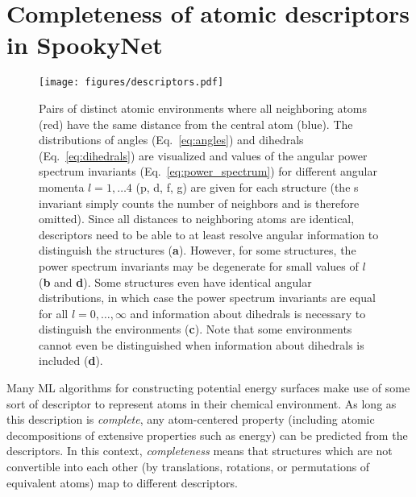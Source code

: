 \documentclass[%
superscriptaddress,
reprint,
nofootinbib,
amsmath,amssymb,amsfonts,
floatfix,
altaffilletter,
showkeys,
]{revtex4-2}
\newcommand{\nn}{SpookyNet}
\begin{document}
\section{Completeness of atomic descriptors in \nn{}}
\label{sec:atomic_descriptors}
\begin{figure*}
	\texttt{[image: figures/descriptors.pdf]}
	\caption{Pairs of distinct atomic environments where all neighboring atoms (red) have the same distance from the central atom (blue). The distributions of angles (Eq.~\ref{eq:angles}) and dihedrals (Eq.~\ref{eq:dihedrals}) are visualized and values of the angular power spectrum invariants (Eq.~\ref{eq:power_spectrum}) for different angular momenta $l=1,\dots4$ (p, d, f, g) are given for each structure (the s invariant simply counts the number of neighbors and is therefore omitted). Since all distances to neighboring atoms are identical, descriptors need to be able to at least resolve angular information to distinguish the structures (\textbf{a}). However, for some structures, the power spectrum invariants may be degenerate for small values of $l$ (\textbf{b} and \textbf{d}). Some structures even have identical angular distributions, in which case the power spectrum invariants are equal for all $l=0,\dots,\infty$ and information about dihedrals is necessary to distinguish the environments (\textbf{c}). Note that some environments cannot even be distinguished when information about dihedrals is included (\textbf{d}).\cite{pozdnyakov2020incompleteness}}
	\label{fig:descriptors}
\end{figure*}
Many ML algorithms for constructing potential energy surfaces make use of some sort of descriptor to represent atoms in their chemical environment. As long as this description is \emph{complete}, any  atom-centered property (including atomic decompositions of extensive properties such as energy) can be predicted from the descriptors.\cite{glielmo2018efficient} In this context, \emph{completeness} means that structures which are not convertible into each other (by translations, rotations, or permutations of equivalent atoms) map to different descriptors.
\end{document}
